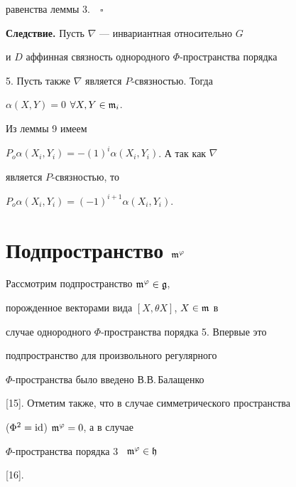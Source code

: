 равенства леммы 3.$\quad\square$


\medskip





{\bf Следствие.} Пусть $\nabla$ --- инвариантная относительно $G$


и $D$ аффинная связность однородного $\Phi$-пространства порядка


5. Пусть также $\nabla$ является $P$-связностью. Тогда


$\alpha(X,Y)=0$ $\forall X,Y \in \frak{m}_i$. 


\medskip





\begin{pf}


Из леммы 9 имеем


$P_o\alpha(X_i,Y_i)=-(1)^i\alpha(X_i,Y_i)$. А так как $\nabla$


является $P$-связностью, то


$P_o\alpha(X_i,Y_i)=(-1)^{i+1}\alpha(X_i,Y_i)$.


\end{pf}





\section{Подпространство $\frak{m}^\varphi$}





Рассмотрим подпространство $\frak{m}^\varphi \in \frak{g}$,


порожденное векторами вида $[X,\theta X]$, $X\in \frak{m}$ в


случае однородного $\Phi$-пространства порядка 5. Впервые это


подпространство для произвольного регулярного


$\Phi$-пространства было введено В.В.\,Балащенко


[15]. Отметим также, что в случае симметрического пространства


($\Phi^2=\operatorname{id}$) $\frak{m}^\varphi=0$, а в случае


$\Phi$-пространства порядка 3 \ $\frak{m}^\varphi \in \frak{h}$


[16].





